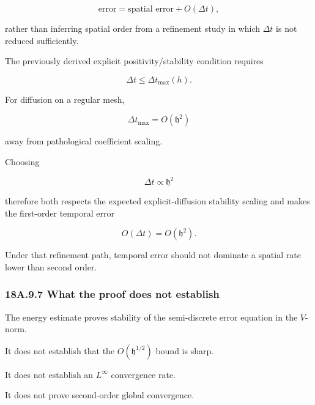 \documentclass[11pt,a4paper]{article}
\begin{document}
\begin{equation}
\boxed{
\text{error}
=
\text{spatial error}
+
O(\Delta t),
}
\tag{TRISO-ACC-306}
\label{eq:triso-acc-306}
\end{equation}

rather than inferring spatial order from a refinement study in which $\Delta t$ is not reduced sufficiently.

The previously derived explicit positivity/stability condition requires

\begin{equation}
\Delta t
\le
\Delta t_{\max}(h).
\tag{TRISO-ACC-307}
\label{eq:triso-acc-307}
\end{equation}

For diffusion on a regular mesh,

\begin{equation}
\Delta t_{\max}=O(\mathfrak h^2)
\tag{TRISO-ACC-308}
\label{eq:triso-acc-308}
\end{equation}

away from pathological coefficient scaling.

Choosing

\begin{equation}
\Delta t\propto\mathfrak h^2
\tag{TRISO-ACC-309}
\label{eq:triso-acc-309}
\end{equation}

therefore both respects the expected explicit-diffusion stability scaling and makes the first-order temporal error

\begin{equation}
O(\Delta t)=O(\mathfrak h^2).
\tag{TRISO-ACC-310}
\label{eq:triso-acc-310}
\end{equation}

Under that refinement path, temporal error should not dominate a spatial rate lower than second order.

\subsubsection*{18A.9.7 What the proof does not establish}

The energy estimate proves stability of the semi-discrete error equation in the $V$-norm.

It does not establish that the $O(\mathfrak h^{1/2})$ bound is sharp.

It does not establish an $L^\infty$ convergence rate.

It does not prove second-order global convergence.
\end{document}
